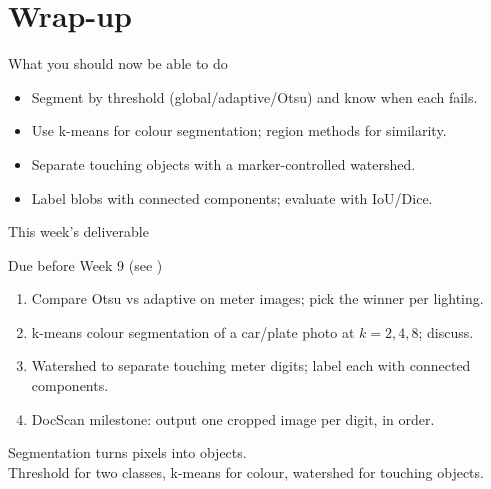 \documentclass[10pt,aspectratio=169]{beamer}
\begin{document}
\section{Wrap-up}

\begin{frame}{What you should now be able to do}
  \begin{itemize}
    \item Segment by threshold (global/adaptive/Otsu) and know when each fails.
    \item Use k-means for colour segmentation; region methods for similarity.
    \item Separate touching objects with a marker-controlled watershed.
    \item Label blobs with connected components; evaluate with IoU/Dice.
  \end{itemize}
\end{frame}

\begin{frame}{This week's deliverable}
  \begin{alertblock}{Due before Week 9 (see )}
    \begin{enumerate}
      \item Compare Otsu vs adaptive on meter images; pick the winner per lighting.
      \item k-means colour segmentation of a car/plate photo at $k=2,4,8$; discuss.
      \item Watershed to separate touching meter digits; label each with connected components.
      \item DocScan milestone: output one cropped image per digit, in order.
    \end{enumerate}
  \end{alertblock}
\end{frame}

\begin{frame}[standout]
  Segmentation turns pixels into objects.\\[4pt]
  \normalsize Threshold for two classes, k-means for colour, watershed for touching objects.
\end{frame}
\end{document}
